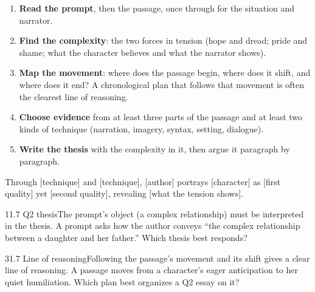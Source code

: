 \documentclass[11pt]{article}
\begin{document}
\begin{enumerate}[leftmargin=1.6em]
\item \textbf{Read the prompt}, then the passage, once through for the situation and narrator.
\item \textbf{Find the complexity}: the two forces in tension (hope and dread; pride and shame; what the character believes and what the narrator shows).
\item \textbf{Map the movement}: where does the passage begin, where does it shift, and where does it end? A chronological plan that follows that movement is often the clearest line of reasoning.
\item \textbf{Choose evidence} from at least three parts of the passage and at least two kinds of technique (narration, imagery, syntax, setting, dialogue).
\item \textbf{Write the thesis} with the complexity in it, then argue it paragraph by paragraph.
\end{enumerate}

\begin{keyidea}
Through [technique] and [technique], [author] portrays [character] as [first quality] yet [second quality], revealing [what the tension shows].
\end{keyidea}

\begin{q}{1}{1.7 Q2 thesis}{The prompt's object (a complex relationship) must be interpreted in the thesis.}
A prompt asks how the author conveys ``the complex relationship between a daughter and her father.'' Which thesis best responds?
\end{q}

\begin{q}{3}{1.7 Line of reasoning}{Following the passage's movement and its shift gives a clear line of reasoning.}
A passage moves from a character's eager anticipation to her quiet humiliation. Which plan best organizes a Q2 essay on it?
\end{q}

\makekey
\end{document}
